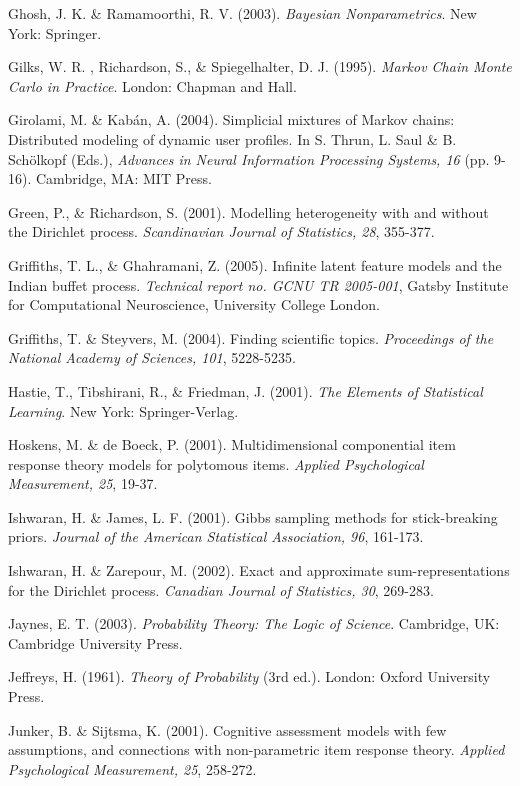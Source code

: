 \documentclass[authoryear]{elsarticle}
\begin{document}
\begin{list}{}{\setlength{\leftmargin}{12pt}\setlength{\itemindent}{-12pt}\setlength{\parsep}{0pt}}
\item Ghosh, J. K. \& Ramamoorthi, R. V. (2003). {\it Bayesian Nonparametrics}. New York: Springer.
\item Gilks, W. R. , Richardson, S., \& Spiegelhalter, D. J. (1995). {\it Markov Chain Monte Carlo in Practice}. London: Chapman and Hall.
\item Girolami, M. \& Kab\'{a}n, A. (2004). Simplicial mixtures of Markov chains: Distributed modeling of dynamic user profiles. In S. Thrun, L. Saul \& B. Sch\"{o}lkopf (Eds.), {\it Advances in Neural Information Processing Systems, 16} (pp. 9-16). Cambridge, MA: MIT Press.
\item Green, P., \& Richardson, S. (2001). Modelling heterogeneity with and without the Dirichlet process. {\it Scandinavian Journal of Statistics, 28}, 355-377.
\item Griffiths, T. L., \& Ghahramani, Z. (2005). Infinite latent feature models and the Indian buffet process. {\it Technical report no. GCNU TR 2005-001}, Gatsby Institute for Computational Neuroscience, University College London.
\item Griffiths, T. \& Steyvers, M. (2004). Finding scientific topics. {\it Proceedings of the National Academy of Sciences, 101}, 5228-5235.
\item Hastie, T., Tibshirani, R., \& Friedman, J. (2001). {\it The Elements of Statistical Learning}. New York: Springer-Verlag.
\item Hoskens, M. \& de Boeck, P. (2001). Multidimensional componential item response theory models for polytomous items. {\it Applied Psychological Measurement, 25}, 19-37.
\item Ishwaran, H. \& James, L. F. (2001). Gibbs sampling methods for stick-breaking priors. {\it  Journal of the American Statistical Association, 96}, 161-173.
\item Ishwaran, H. \& Zarepour, M. (2002). Exact and approximate sum-representations for the Dirichlet process. {\it Canadian Journal of Statistics, 30}, 269-283.
\item Jaynes, E. T. (2003). {\it Probability Theory: The Logic of Science}. Cambridge, UK: Cambridge University Press.
\item Jeffreys, H. (1961). {\it Theory of Probability} (3rd ed.). London: Oxford University Press.
\item Junker, B. \& Sijtsma, K. (2001). Cognitive assessment models with few assumptions, and connections with non-parametric item response theory. {\it Applied Psychological Measurement, 25}, 258-272.

\end{list}
\end{document}
